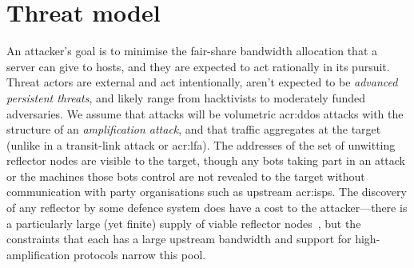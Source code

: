 %

\section{Threat model}\label{sec:ddos-threat}
An attacker's goal is to minimise the fair-share bandwidth allocation that a server can give to hosts, and they are expected to act rationally in its pursuit.
Threat actors are external and act intentionally, aren't expected to be 
\emph{advanced persistent threats}, and likely range from hacktivists to moderately funded adversaries.
We assume that attacks will be volumetric \gls{acr:ddos} attacks with the structure of an \emph{amplification attack}, and that traffic aggregates at the target (unlike in a transit-link attack or \gls{acr:lfa}).
The addresses of the set of unwitting reflector nodes are visible to the target, though any bots taking part in an attack or the machines those bots control are not revealed to the target without communication with  party organisations such as upstream \glspl{acr:isp}.
The discovery of any reflector by some defence system does have a cost to the attacker---there is a particularly large (yet finite) supply of viable reflector nodes~\parencite{DBLP:conf/ndss/Rossow14}, but the constraints that each has a large upstream bandwidth and support for high-amplification protocols narrow this pool.

